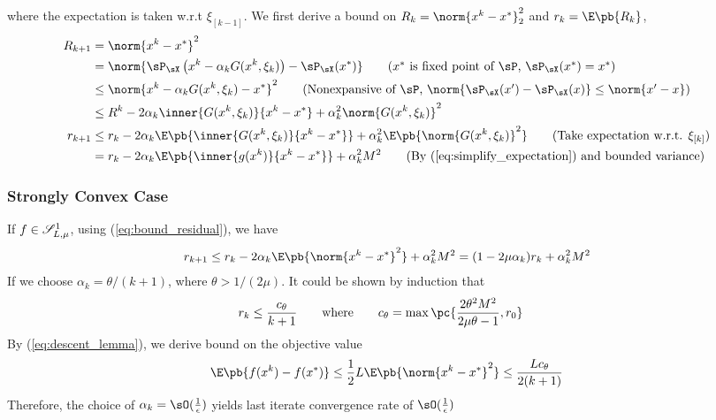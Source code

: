 \documentclass[../summary.tex]{subfiles}
\begin{document}
where the expectation is taken w.r.t $\xi_{[k-1]}$. We first derive a bound on $R_k = \norm{x^k-x^*}_2^2$ and $r_k = \E\pb{R_k}$,
\begin{align*}
    R_{k+1}
        &= \norm{x^k-x^*}^2 \\
        &= \norm{ \sP_{\sX}\left( x^k - \alpha_k G(x^k,\xi_k) \right) - \sP_{\sX}(x^*)  }
            \tag{$x^*$ is fixed point of $\sP$, $\sP_{\sX}(x^*) = x^*$} \\
        &\leq \norm{ x^k - \alpha_k G(x^k,\xi_k) - x^* }^2
            \tag{Nonexpansive of $\sP$, $\norm{\sP_{\sX}(x')-\sP_{\sX}(x)} \leq \norm{x'-x}$} \\ 
        &\leq R^k - 2\alpha_k\inner{G(x^k,\xi_k)}{x^k-x^*} + \alpha_k^2\norm{G(x^k,\xi_k)}^2 \\
    r_{k+1}
        &\leq r_k - 2\alpha_k \E\pb{ \inner{G(x^k,\xi_k)}{x^k-x^*} } + \alpha_k^2 \E\pb{ \norm{G(x^k,\xi_k)}^2 }
            \tag{Take expectation w.r.t. $\xi_{[k]}$} \\
        &= r_k - 2\alpha_k \E\pb{\inner{g(x^k)}{x^k-x^*}} + \alpha_k^2 M^2
            \tag{By (\ref{eq:simplify_expectation}) and bounded variance}
\end{align*}

\subsubsection{Strongly Convex Case}

If $f\in\mathscr{S}_{L,\mu}^1$, using (\ref{eq:bound_residual}), we have
\begin{align*}
    r_{k+1}
        \leq r_k - 2\alpha_k \E\pb{\norm{x^k-x^*}^2} + \alpha_k^2 M^2
        = (1-2\mu \alpha_k ) r_k + \alpha_k^2M^2
\end{align*}
If we choose $\alpha_k = \theta/(k+1)$, where $\theta > 1/(2\mu)$. It could be shown by induction that \cite{nemirovskiRobustStochasticApproximation2009}
\begin{align*}
    r_k 
        &\leq \frac{c_{\theta}}{k+1}
            \quad\quad\text{where}\quad\quad
            c_{\theta} = \max\pc{
                \frac{2\theta^2M^2}{2\mu\theta - 1}, r_0
            }
\end{align*}
By (\ref{eq:descent_lemma}), we derive bound on the objective value
\begin{align*}
    \E\pb{f(x^k) - f(x^*)}
        \leq \frac{1}{2} L \E\pb{\norm{x^k-x^*}^2}
        \leq \frac{Lc_{\theta}}{2(k+1)}
\end{align*}
Therefore, the choice of $\alpha_k=\sO(\frac{1}{\epsilon})$ yields last iterate convergence rate of $\sO(\frac{1}{\epsilon})$
\end{document}
